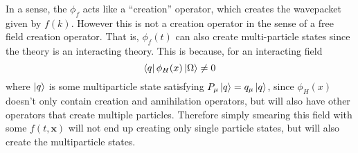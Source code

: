 \documentclass[11pt, notitlepage]{report}
\numberwithin{equation}{section}
\begin{document}
In a sense, the \(\phi_f\) acts like a ``creation'' operator, which creates the wavepacket given by \(f(k)\). However this is not a creation operator in the sense of a free field creation operator. That is, \(\phi_f(t)\) can also create multi-particle states since the theory is an interacting theory. This is because, for an interacting field 
\begin{equation*}
    \bra{q} \phi_H(x) \ket{\Omega} \ne 0
\end{equation*}
where \(\ket{q}\) is some multiparticle state satisfying \(P_\mu\ket{q} = q_\mu \ket{q}\), since \(\phi_H(x)\) doesn't only contain creation and annihilation operators, but will also have other operators that create multiple particles. Therefore simply smearing this field with some \(f(t, \textbf{x})\) will not end up creating only single particle states, but will also create the multiparticle states.\\
\end{document}
